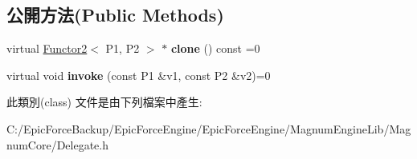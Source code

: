 \subsection*{公開方法(Public Methods)}
\begin{DoxyCompactItemize}
\item 
virtual \hyperlink{class_magnum_1_1_functor2}{Functor2}$<$ P1, P2 $>$ $\ast$ {\bfseries clone} () const  =0\hypertarget{class_magnum_1_1_functor2_a8b83f14385d583c2bf231804b2e082fd}{}\label{class_magnum_1_1_functor2_a8b83f14385d583c2bf231804b2e082fd}

\item 
virtual void {\bfseries invoke} (const P1 \&v1, const P2 \&v2)=0\hypertarget{class_magnum_1_1_functor2_a662d87660714f6d84e25e067a9bea989}{}\label{class_magnum_1_1_functor2_a662d87660714f6d84e25e067a9bea989}

\end{DoxyCompactItemize}


此類別(class) 文件是由下列檔案中產生\+:\begin{DoxyCompactItemize}
\item 
C\+:/\+Epic\+Force\+Backup/\+Epic\+Force\+Engine/\+Epic\+Force\+Engine/\+Magnum\+Engine\+Lib/\+Magnum\+Core/Delegate.\+h\end{DoxyCompactItemize}
